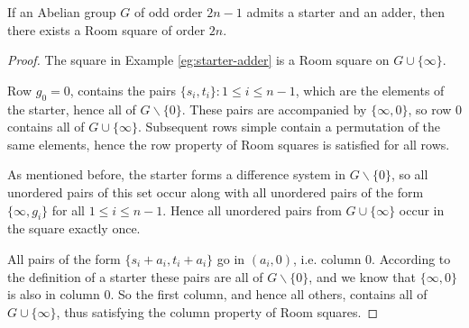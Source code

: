 \begin{theorem}
\label{thm:starter-adder}
If an Abelian group $G$ of odd order $2n - 1$ admits a starter and an adder, then there exists a Room square of order $2n$.
\end{theorem}

\begin{proof}

The square in Example \ref{eg:starter-adder} is a Room square on $G \cup \{\infty\}$.

Row $g_0 = 0$, contains the pairs $\{s_i, t_i\}: 1 \leq i \leq n - 1$, which are the elements of the starter, hence all of $G \backslash \{0\}$.
These pairs are accompanied by $\{\infty, 0\}$, so row 0 contains all of $G \cup \{\infty\}$.
Subsequent rows simple contain a permutation of the same elements, hence the row property of Room squares is satisfied for all rows.

As mentioned before, the starter forms a difference system in $G \backslash \{0\}$, so all unordered pairs of this set occur along with all unordered pairs of the form $\{\infty, g_i\}$ for all $1 \leq i \leq n - 1$.
Hence all unordered pairs from $G \cup \{\infty\}$ occur in the square exactly once.

All pairs of the form $\{s_i + a_i, t_i + a_i\}$ go in $(a_i, 0)$, i.e. column 0.
According to the definition of a starter these pairs are all of $G \backslash \{0\}$, and we know that $\{\infty,0\}$ is also in column 0.
So the first column, and hence all others, contains all of $G \cup \{\infty\}$, thus satisfying the column property of Room squares.
\end{proof}
